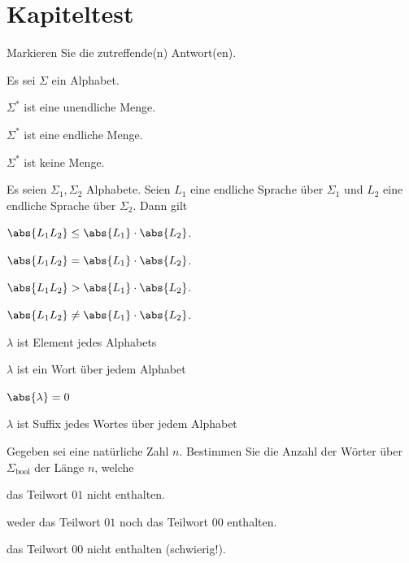 \clearpage
\shipoutAnswer


\clearpage
\section{Kapiteltest}

\begin{myexercise}\label{myexercise:kp00}
	Markieren Sie die zutreffende(n) Antwort(en).
	\begin{aenum}
		\item Es sei $\Sigma$ ein Alphabet.
		\begin{todolist}
			\item $\Sigma^*$ ist eine unendliche Menge.
			\item $\Sigma^*$ ist eine endliche Menge.
			\item $\Sigma^*$ ist keine Menge.
		\end{todolist}
		\item Es seien $\Sigma_1, \Sigma_2$ Alphabete. Seien $L_1$ eine endliche Sprache über $\Sigma_1$ und $L_2$ eine endliche Sprache über $\Sigma_2$. Dann gilt
		\begin{todolist}
			\item $\abs{L_1L_2} \leq \abs{L_1}\cdot \abs{L_2}$.
			\item $\abs{L_1L_2} = \abs{L_1}\cdot \abs{L_2}$.
			\item $\abs{L_1L_2} > \abs{L_1}\cdot \abs{L_2}$.
			\item $\abs{L_1L_2} \neq \abs{L_1}\cdot \abs{L_2}$.
		\end{todolist}
		\item
		\begin{todolist}
			\item $\lambda$ ist Element jedes Alphabets
			\item $\lambda$ ist ein Wort über jedem Alphabet
			\item $\abs{\lambda} = 0$
			\item $\lambda$ ist Suffix jedes Wortes über jedem Alphabet
		\end{todolist}
	\end{aenum}
\end{myexercise}


\begin{myexercise}\label{myexercise:kp01}
	Gegeben sei eine natürliche Zahl $n$. Bestimmen Sie die Anzahl der Wörter über $\Sigma_{\text{bool}}$ der Länge $n$, welche
	\begin{aenum}
		\item das Teilwort $01$ nicht enthalten.
		\item weder das Teilwort $01$ noch das Teilwort $00$ enthalten.
		\item das Teilwort $00$ nicht enthalten (schwierig!).
	\end{aenum}
\end{myexercise}

